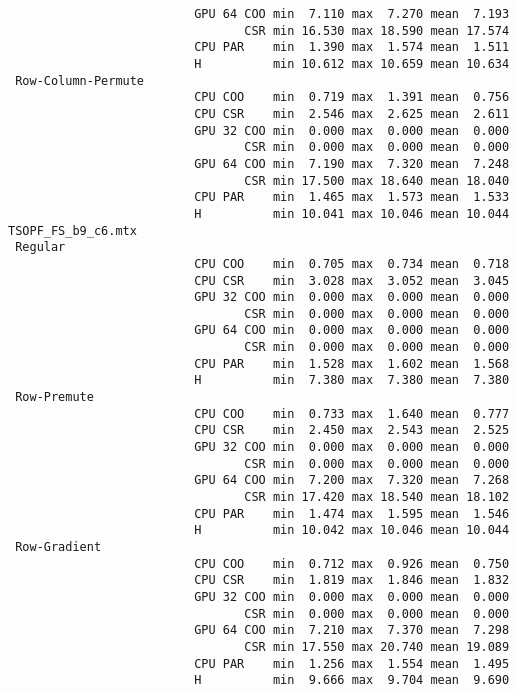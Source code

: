 \begin{verbatim}
                          GPU 64 COO min  7.110 max  7.270 mean  7.193
                                 CSR min 16.530 max 18.590 mean 17.574
                          CPU PAR    min  1.390 max  1.574 mean  1.511
                          H          min 10.612 max 10.659 mean 10.634
 Row-Column-Permute
                          CPU COO    min  0.719 max  1.391 mean  0.756
                          CPU CSR    min  2.546 max  2.625 mean  2.611
                          GPU 32 COO min  0.000 max  0.000 mean  0.000
                                 CSR min  0.000 max  0.000 mean  0.000
                          GPU 64 COO min  7.190 max  7.320 mean  7.248
                                 CSR min 17.500 max 18.640 mean 18.040
                          CPU PAR    min  1.465 max  1.573 mean  1.533
                          H          min 10.041 max 10.046 mean 10.044
TSOPF_FS_b9_c6.mtx
 Regular
                          CPU COO    min  0.705 max  0.734 mean  0.718
                          CPU CSR    min  3.028 max  3.052 mean  3.045
                          GPU 32 COO min  0.000 max  0.000 mean  0.000
                                 CSR min  0.000 max  0.000 mean  0.000
                          GPU 64 COO min  0.000 max  0.000 mean  0.000
                                 CSR min  0.000 max  0.000 mean  0.000
                          CPU PAR    min  1.528 max  1.602 mean  1.568
                          H          min  7.380 max  7.380 mean  7.380
 Row-Premute
                          CPU COO    min  0.733 max  1.640 mean  0.777
                          CPU CSR    min  2.450 max  2.543 mean  2.525
                          GPU 32 COO min  0.000 max  0.000 mean  0.000
                                 CSR min  0.000 max  0.000 mean  0.000
                          GPU 64 COO min  7.200 max  7.320 mean  7.268
                                 CSR min 17.420 max 18.540 mean 18.102
                          CPU PAR    min  1.474 max  1.595 mean  1.546
                          H          min 10.042 max 10.046 mean 10.044
 Row-Gradient
                          CPU COO    min  0.712 max  0.926 mean  0.750
                          CPU CSR    min  1.819 max  1.846 mean  1.832
                          GPU 32 COO min  0.000 max  0.000 mean  0.000
                                 CSR min  0.000 max  0.000 mean  0.000
                          GPU 64 COO min  7.210 max  7.370 mean  7.298
                                 CSR min 17.550 max 20.740 mean 19.089
                          CPU PAR    min  1.256 max  1.554 mean  1.495
                          H          min  9.666 max  9.704 mean  9.690

\end{verbatim}
